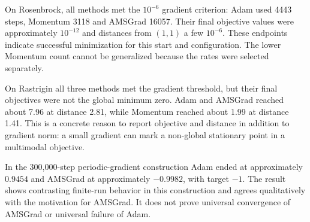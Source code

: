 ﻿\documentclass[conference]{IEEEtran}
\begin{document}
On Rosenbrock, all methods met the $10^{-6}$ gradient criterion: Adam used 4443 steps, Momentum 3118 and AMSGrad 16057. Their final objective values were approximately $10^{-12}$ and distances from $(1,1)$ a few $10^{-6}$. These endpoints indicate successful minimization for this start and configuration. The lower Momentum count cannot be generalized because the rates were selected separately.

On Rastrigin all three methods met the gradient threshold, but their final objectives were not the global minimum zero. Adam and AMSGrad reached about 7.96 at distance 2.81, while Momentum reached about 1.99 at distance 1.41. This is a concrete reason to report objective and distance in addition to gradient norm: a small gradient can mark a non-global stationary point in a multimodal objective.

In the 300,000-step periodic-gradient construction Adam ended at approximately $0.9454$ and AMSGrad at approximately $-0.9982$, with target $-1$. The result shows contrasting finite-run behavior in this construction and agrees qualitatively with the motivation for AMSGrad. It does not prove universal convergence of AMSGrad or universal failure of Adam.
\end{document}
